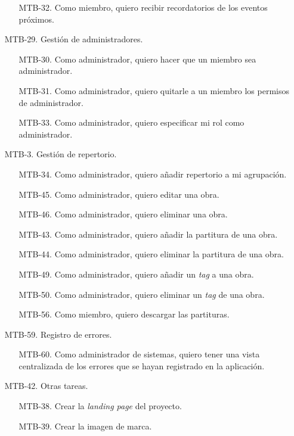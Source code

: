 \begin{enumerate}
        \begin{enumerate}
            \item[MTB-32.] Como miembro, quiero recibir recordatorios de los eventos próximos.
        \end{enumerate}
    \item[MTB-29.] Gestión de administradores.
        \begin{enumerate}
            \item[MTB-30.] Como administrador, quiero hacer que un miembro sea administrador.
            \item[MTB-31.] Como administrador, quiero quitarle a un miembro los permisos de administrador.
            \item[MTB-33.] Como administrador, quiero especificar mi rol como administrador.
        \end{enumerate}
    \item[MTB-3.] Gestión de repertorio.
        \begin{enumerate}
            \item[MTB-34.] Como administrador, quiero añadir repertorio a mi agrupación.
            \item[MTB-45.] Como administrador, quiero editar una obra.
            \item[MTB-46.] Como administrador, quiero eliminar una obra.
            \item[MTB-43.] Como administrador, quiero añadir la partitura de una obra.
            \item[MTB-44.] Como administrador, quiero eliminar la partitura de una obra.
            \item[MTB-49.] Como administrador, quiero añadir un \textit{tag} a una obra.
            \item[MTB-50.] Como administrador, quiero eliminar un \textit{tag} de una obra.
            \item[MTB-56.] Como miembro, quiero descargar las partituras.
        \end{enumerate}
    \item[MTB-59.] Registro de errores.
        \begin{enumerate}
            \item[MTB-60.] Como administrador de sistemas, quiero tener una vista centralizada de los errores que se hayan registrado en la aplicación.
        \end{enumerate}
    \item[MTB-42.] Otras tareas.
        \begin{enumerate}
            \item[MTB-38.] Crear la \textit{landing page} del proyecto.
            \item[MTB-39.] Crear la imagen de marca.
        \end{enumerate}
\end{enumerate}


